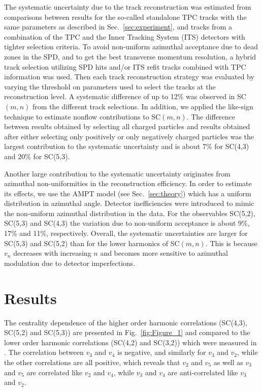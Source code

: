 The systematic uncertainty due to the track reconstruction was estimated from comparisons between results for the so-called standalone TPC tracks with the 
same parameters as described in Sec.~\ref{sec:experiment}, and tracks from a combination of the TPC and the Inner Tracking System (ITS) detectors with tighter selection criteria.
To avoid non-uniform azimuthal acceptance due to dead zones in the SPD, and to get the best transverse momentum resolution, a hybrid track selection utilizing SPD hits and/or ITS refit tracks combined with TPC information was used.
Then each track reconstruction strategy was evaluated by varying the threshold on parameters used to select the tracks at the reconstruction level. 
A systematic difference of up to 12\% was observed in SC$(m,n)$ from the different track selections. 
In addition, we applied the like-sign technique to estimate nonflow contributions to SC$(m,n)$. The difference between results obtained by selecting all charged particles and results obtained after either selecting only positively or only negatively charged particles was the largest contribution to the systematic uncertainty and is about 7\% for SC(4,3) and 20\% for SC(5,3). 

Another large contribution to the systematic uncertainty originates from azimuthal non-uniformities in the reconstruction efficiency. In order to estimate its effects, we use the AMPT model (see Sec.~\ref{sec:theory}) which has a uniform distribution in azimuthal angle.
Detector inefficiencies were introduced to mimic the non-uniform azimuthal distribution in the data. For the observables SC(5,2), SC(5,3) and SC(4,3) the variation due to non-uniform acceptance is about 9\%, 17\% and 11\%, respectively.
Overall, the systematic uncertainties are larger for SC(5,3) and SC(5,2) than for the lower harmonics of SC$(m,n)$.
This is because $v_{n}$ decreases with increasing $n$ and becomes more sensitive to azimuthal modulation due to detector imperfections. 

\section{Results}
\label{sec:results}
The centrality dependence of the higher order harmonic correlations (SC(4,3), SC(5,2) and SC(5,3)) are presented in Fig.~\ref{fig:Figure_1} and compared to the lower order harmonic correlations (SC(4,2) and SC(3,2)) which were measured in \cite{ALICE:2016kpq}. The correlation between $v_3$ and $v_4$ is negative, and similarly for $v_3$ and $v_2$, while the other correlations are all positive, which reveals that $v_2$ and $v_5$ as well as $v_3$ and $v_5$ are correlated like $v_2$ and $v_4$, while $v_3$ and $v_4$ are anti-correlated like $v_3$ and $v_2$.


